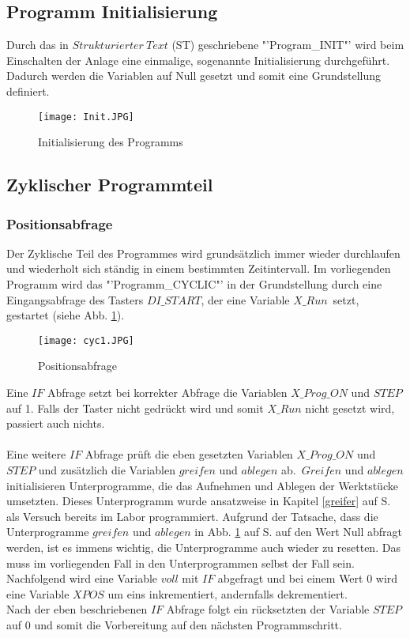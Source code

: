 \documentclass[12pt,a4paper]{scrartcl}	%
\begin{document}
\subsection{Programm Initialisierung}
Durch das in $Strukturierter~Text$ (ST) geschriebene "'Program\_INIT"' wird beim Einschalten der Anlage eine einmalige, sogenannte Initialisierung durchgeführt. Dadurch werden die Variablen auf Null gesetzt und somit eine Grundstellung definiert.
\begin{figure}[h] 
	\centering
	\texttt{[image: Init.JPG]}
	\caption[Initialisierung des Programms]{Initialisierung des Programms}
	\vspace{-10pt}
\end{figure}
\subsection{Zyklischer Programmteil}
\subsubsection{Positionsabfrage}
Der Zyklische Teil des Programmes wird grundsätzlich immer wieder durchlaufen und wiederholt sich ständig in einem bestimmten Zeitintervall. Im vorliegenden Programm wird das "'Programm\_CYCLIC"' in der Grundstellung durch eine Eingangsabfrage des Tasters $DI\_START$, der eine Variable $X\_Run$~setzt, gestartet (siehe Abb. \ref{pos}).
\begin{figure}[h] 
	\vspace{-10pt}
	\centering
	\texttt{[image: cyc1.JPG]}
	\caption[Positionsabfrage]{Positionsabfrage}
	\label{pos}
\end{figure}
Eine $IF$ Abfrage setzt bei korrekter Abfrage die \mbox{Variablen} $X\_Prog\_ON$ und $STEP$ auf 1. Falls der Taster nicht gedrückt wird und somit $X\_Run$ nicht gesetzt wird, passiert auch nichts.\\
\\
Eine weitere $IF$ Abfrage prüft die eben gesetzten Variablen $X\_Prog\_ON$ und $STEP$ und zusätzlich die Variablen $greifen$ und $ablegen$ ab.~$Greifen$ und $ablegen$ initialisieren Unterprogramme, die das Aufnehmen und Ablegen der Werktstücke umsetzten. Dieses Unterprogramm wurde ansatzweise in Kapitel \ref{greifer} auf S. \pageref{greifer} als Versuch bereits im Labor programmiert. Aufgrund der Tatsache, dass die Unterprogramme $greifen$ und $ablegen$ in Abb. \ref{pos} auf S. \pageref{pos} auf den Wert Null abfragt werden, ist es immens wichtig, die Unterprogramme auch wieder zu resetten. Das muss im vorliegenden Fall in den Unterprogrammen selbst der Fall sein.\\
Nachfolgend wird eine Variable $voll$ mit $IF$ abgefragt und bei einem Wert 0 wird eine Variable $XPOS$ um eins inkrementiert, andernfalls dekrementiert.\\
Nach der eben beschriebenen $IF$ Abfrage folgt ein rücksetzten der Variable $STEP$ auf 0 und somit die Vorbereitung auf den nächsten Programmschritt.\\
\end{document}
